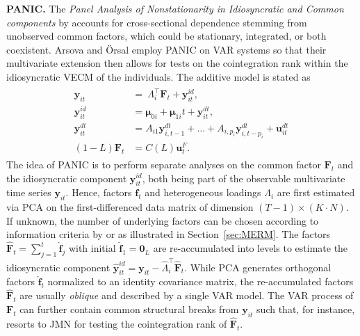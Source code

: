 \textbf{PANIC.} The \textit{Panel Analysis of Nonstationarity in Idiosyncratic and Common components} by \citet{BaiNg2004} accounts for cross-sectional dependence stemming from unobserved common factors, which could be stationary, integrated, or both coexistent. Arsova and Örsal \citeyearpar{OersalArsova2017,ArsovaOersal2018} employ PANIC on VAR systems so that their multivariate extension then allows for tests on the cointegration rank within the idiosyncratic VECM of the individuals. The additive model is stated as
\begin{align} \label{eq:PANIC}
\begin{split}
	\boldsymbol{y}_{it} \ & = \ \Lambda_i^\top \boldsymbol{F}_t + \boldsymbol{y}^{i \! d}_{it}, \\
	\boldsymbol{y}^{i \! d}_{it} \ & = \boldsymbol{\mu}_{0i} + \boldsymbol{\mu}_{1i}t + \boldsymbol{y}^{d \! t}_{it}, \\
	\boldsymbol{y}^{d \! t}_{it} \ & = A_{i1} \boldsymbol{y}^{d \! t}_{i,t-1} + \ldots + A_{i,p_i} \boldsymbol{y}^{d \! t}_{i,t-p_i} + \boldsymbol{u}^{d \! t}_{it} \\
	(1-L) \boldsymbol{F}_t & = C(L) \boldsymbol{u}^{F}_t.
\end{split}
\end{align}
The idea of PANIC is to perform separate analyses on the common factor $ \boldsymbol{F}_t $ and the idiosyncratic component $ \boldsymbol{y}^{i \! d}_{it} $, both being part of the observable multivariate time series $ \boldsymbol{y}_{it} $. Hence, factors $ \boldsymbol{f}_t $ and heterogeneous loadings $ \Lambda_i $ are first estimated via PCA on the first-differenced data matrix of dimension $ (T-1) \times (K \cdot N) $. If unknown, the number of underlying factors can be chosen according to information criteria by \citet{BaiNg2002} or \citet{Onatski2010} as illustrated in Section~\ref{sec:MERM}. The factors $ \boldsymbol{\hat{F}}_t = \sum_{j=1}^{t} \boldsymbol{\hat{f}}_j $ with initial $ \boldsymbol{\hat{f}}_1 = \boldsymbol{0}_L $ are re-accumulated into levels to estimate the idiosyncratic component $ \boldsymbol{\hat{y}}^{i \! d}_{it} = \boldsymbol{y}_{it} - \hat{\Lambda}_i^\top \boldsymbol{\hat{F}}_t $. While PCA generates orthogonal factors $ \boldsymbol{\hat{f}}_t $ normalized to an identity covariance matrix, the re-accumulated factors $ \boldsymbol{\hat{F}}_t $ are usually \textit{oblique} and described by a single VAR model. The VAR process of $ \boldsymbol{{F}}_t $ can further contain common structural breaks from $ \boldsymbol{y}_{it} $ such that, for instance, \citet{Oersal2017} resorts to JMN \citeyearpar{JohansenEtAl2000} for testing the cointegration rank of $ \boldsymbol{\hat{F}}_t $.

